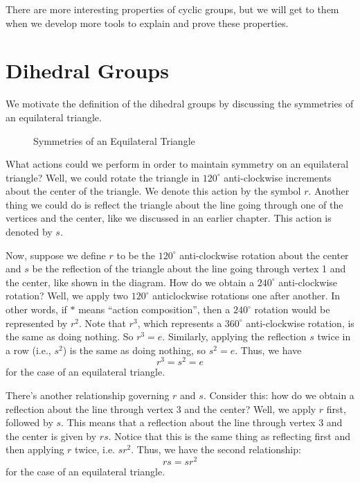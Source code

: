 There are more interesting properties of cyclic groups, but we will get to them when we develop more tools to explain and prove these properties.

\newpage

\section{Dihedral Groups}
We motivate the definition of the dihedral groups by discussing the symmetries of an equilateral triangle.

\begin{figure}[h]
    \centering
    \caption{Symmetries of an Equilateral Triangle}
\end{figure}

What actions could we perform in order to maintain symmetry on an equilateral triangle? Well, we could rotate the triangle in $120^\circ$ anti-clockwise increments about the center of the triangle. We denote this action by the symbol $r$. Another thing we could do is reflect the triangle about the line going through one of the vertices and the center, like we discussed in an earlier chapter. This action is denoted by $s$.

Now, suppose we define $r$ to be the $120^\circ$ anti-clockwise rotation about the center and $s$ be the reflection of the triangle about the line going through vertex 1 and the center, like shown in the diagram. How do we obtain a $240^\circ$ anti-clockwise rotation? Well, we apply two $120^\circ$ anticlockwise rotations one after another. In other words, if $\ast$ means ``action composition'', then a $240^\circ$ rotation would be represented by $r^2$. Note that $r^3$, which represents a $360^\circ$ anti-clockwise rotation, is the same as doing nothing. So $r^3 = e$. Similarly, applying the reflection $s$ twice in a row (i.e., $s^2$) is the same as doing nothing, so $s^2 = e$. Thus, we have
\[
    r^3 = s^2 = e
\]
for the case of an equilateral triangle.

There's another relationship governing $r$ and $s$. Consider this: how do we obtain a reflection about the line through vertex 3 and the center? Well, we apply $r$ first, followed by $s$. This means that a reflection about the line through vertex 3 and the center is given by $rs$. Notice that this is the same thing as reflecting first and then applying $r$ twice, i.e. $sr^2$. Thus, we have the second relationship:
\[
    rs = sr^2
\]
for the case of an equilateral triangle.


